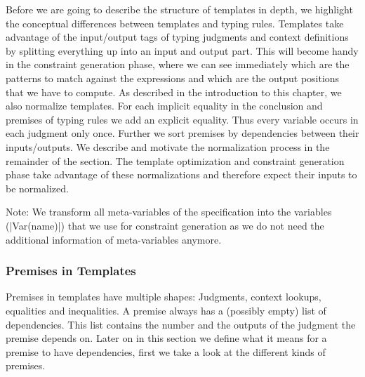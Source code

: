 Before we are going to describe the structure of templates in depth,
we highlight the conceptual differences between templates and typing
rules. Templates take advantage of the input/output tags of typing
judgments and context definitions by splitting everything up into an
input and output part. This will become handy in the constraint
generation phase, where we can see immediately which are the patterns
to match against the expressions and which are the output positions
that we have to compute. As described in the introduction to this
chapter, we also normalize templates. For each implicit equality in
the conclusion and premises of typing rules we add an explicit
equality. Thus every variable occurs in each judgment only
once. Further we sort premises by dependencies between their
inputs/outputs. We describe and motivate the normalization process in
the remainder of the section. The template optimization and constraint
generation phase take advantage of these normalizations and therefore
expect their inputs to be normalized.

Note: We transform all meta-variables of the specification into the
variables (\code|Var(name)|) that we use for constraint generation as
we do not need the additional information of meta-variables anymore.

\subsubsection{Premises in Templates}
Premises in templates have multiple shapes: Judgments, context
lookups, equalities and inequalities. A premise always has a (possibly
empty) list of dependencies. This list contains the number and the
outputs of the judgment the premise depends on. Later on in this
section we define what it means for a premise to have dependencies,
first we take a look at the different kinds of premises.

